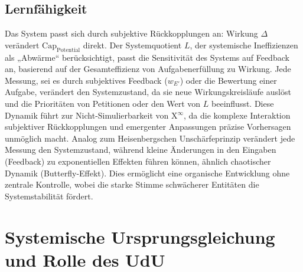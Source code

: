 \documentclass[12pt]{scrartcl}
\begin{document}
\subsection{Lernfähigkeit}
Das System passt sich durch subjektive Rückkopplungen an: Wirkung $\Delta$ verändert $\text{Cap}_{\text{Potential}}$ direkt. Der Systemquotient $L$, der systemische Ineffizienzen als „Abwärme“ berücksichtigt, passt die Sensitivität des Systems auf Feedback an, basierend auf der Gesamteffizienz von Aufgabenerfüllung zu Wirkung. Jede Messung, sei es durch subjektives Feedback ($w_{E'}$) oder die Bewertung einer Aufgabe, verändert den Systemzustand, da sie neue Wirkungskreisläufe auslöst und die Prioritäten von Petitionen oder den Wert von $L$ beeinflusst. Diese Dynamik führt zur Nicht-Simulierbarkeit von X$^\infty$, da die komplexe Interaktion subjektiver Rückkopplungen und emergenter Anpassungen präzise Vorhersagen unmöglich macht. Analog zum Heisenbergschen Unschärfeprinzip verändert jede Messung den Systemzustand, während kleine Änderungen in den Eingaben (Feedback) zu exponentiellen Effekten führen können, ähnlich chaotischer Dynamik (Butterfly-Effekt). Dies ermöglicht eine organische Entwicklung ohne zentrale Kontrolle, wobei die starke Stimme schwächerer Entitäten die Systemstabilität fördert.

\section{Systemische Ursprungsgleichung und Rolle des UdU}
\label{sec:Ursprungsgleichung_UdU}
\end{document}
